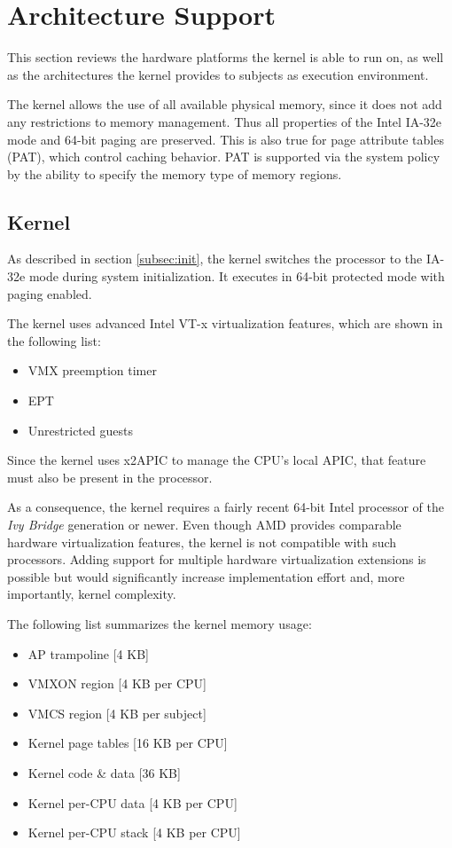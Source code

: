 \section{Architecture Support}\label{sec:arch-support}
This section reviews the hardware platforms the kernel is able to run on, as
well as the architectures the kernel provides to subjects as execution
environment.

The kernel allows the use of all available physical memory, since it does not
add any restrictions to memory management. Thus all properties of the Intel
IA-32e mode and 64-bit paging are preserved. This is also true for page
attribute tables (PAT), which control caching behavior. PAT is supported via the
system policy by the ability to specify the memory type of memory regions.

\subsection{Kernel}
As described in section \ref{subsec:init}, the kernel switches the processor to
the IA-32e mode during system initialization. It executes in 64-bit protected
mode with paging enabled.

The kernel uses advanced Intel VT-x virtualization features, which are shown in
the following list:

\begin{itemize}
	\item VMX preemption timer
	\item EPT
	\item Unrestricted guests
\end{itemize}

Since the kernel uses x2APIC to manage the CPU's local APIC, that feature must
also be present in the processor.

As a consequence, the kernel requires a fairly recent 64-bit Intel processor of
the \emph{Ivy Bridge} generation or newer. Even though AMD provides comparable
hardware virtualization features, the kernel is not compatible with such
processors. Adding support for multiple hardware virtualization extensions is
possible but would significantly increase implementation effort and, more
importantly, kernel complexity.

The following list summarizes the kernel memory usage:

\begin{itemize}
	\item AP trampoline [4 KB]
	\item VMXON region [4 KB per CPU]
	\item VMCS region [4 KB per subject]
	\item Kernel page tables [16 KB per CPU]
	\item Kernel code \& data [36 KB]
	\item Kernel per-CPU data  [4 KB per CPU]
	\item Kernel per-CPU stack [4 KB per CPU]
\end{itemize}

